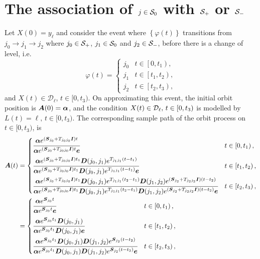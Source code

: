 \section{The association of \(j\in\mathcal{S}_0\) with \(\mathcal{S}_+\) or \(\mathcal{S}_-\)}\label{sec: zero states}
Let \(X(0)=y_\ell\) and consider the event where \(\left\{\varphi(t)\right\}\) transitions from \(j_0\to j_1\to j_2\) where \(j_0\in\mathcal{S}_+\), \(j_1\in\mathcal{S}_0\) and \(j_2\in\mathcal{S}_-\), before there is a change of level, i.e.~
\[\varphi(t) = \begin{cases}
	j_0 & t\in\left[0,t_1\right), \\
	j_1 & t\in\left[t_1,t_2\right), \\
	j_2 & t\in\left[t_2,t_3\right),
\end{cases}\]
and \(X(t)\in\mathcal D_\ell\), \(t\in[0,t_3)\). 
On approximating this event, the initial orbit position is \(\boldsymbol A(0)=\boldsymbol \alpha\), and the condition \(X(t)\in\mathcal{D}_\ell,\, t\in [0,t_3)\) is modelled by \(L(t)=\ell,\, t\in[0,t_3)\). The corresponding sample path of the orbit process on \(t\in[0,t_3)\), is 
\begin{align*}
\bs A(t) &= \begin{cases} 
	\cfrac{\bs \alpha e^{(\bs{S}_{j_0}+T_{{j_0}{j_0}}\bs{I})t}}{\bs \alpha e^{(\bs{S}_{j_0}+T_{{j_0}{j_0}}\bs{I})t}\bs e} & t\in\left[0,t_1\right), \\[10pt]
	\cfrac{\bs \alpha e^{(\bs{S}_{j_0}+T_{{j_0}{j_0}}\bs{I})t_1}\bs{D}({j_0},{j_1})e^{T_{{j_1}{j_1}}(t-t_1)}}{\bs \alpha e^{(\bs{S}_{j_0}+T_{{j_0}{j_0}}\bs{I})t_1}\bs{D}({j_0},{j_1})e^{T_{{j_1}{j_1}}(t-t_1)}\bs e} & t\in\left[t_1,t_2\right), \\[10pt]
	\cfrac{\bs \alpha e^{(\bs{S}_{j_0}+T_{{j_0}{j_0}}\bs{I})t_1}\bs{D}({j_0},{j_1})e^{T_{{j_1}{j_1}}(t_2-t_1)}\bs{D}({j_1},{j_2})e^{(\bs{S}_{j_2}+T_{{j_2}{j_2}}\bs{I})(t-t_2)}}{\bs \alpha e^{(\bs{S}_{j_0}+T_{{j_0}{j_0}}\bs{I})t_1}\bs{D}({j_0},{j_1})e^{T_{{j_1}{j_1}}(t_2-t_1)}\bs{D}({j_1},{j_2})e^{(\bs{S}_{j_2}+T_{{j_2}{j_2}}\bs{I})(t-t_2)}\bs e} & t\in\left[t_2,t_3\right),
\end{cases}
%
\\&= \begin{cases} 
	\cfrac{\bs \alpha e^{\bs{S}_{j_0}t}}{\bs \alpha e^{\bs{S}_{{j_0}}t}\bs e} & t\in\left[0,t_1\right), \\[10pt]
	\cfrac{\bs \alpha e^{\bs{S}_{j_0}t_1}\bs{D}({j_0},{j_1})}{\bs \alpha e^{\bs{S}_{j_0}t_1}\bs{D}({j_0},{j_1})\bs e} & t\in\left[t_1,t_2\right), \\[10pt] 
	\cfrac{\bs \alpha e^{\bs{S}_{j_0}t_1}\bs{D}({j_0},{j_1})\bs{D}({j_1},{j_2})e^{\bs{S}_{j_2}(t-t_2)}}{\bs \alpha e^{\bs{S}_{j_0}t_1}\bs{D}({j_0},{j_1})\bs{D}({j_1},{j_2})e^{\bs{S}_{j_2}(t-t_2)}\bs e} & t\in\left[t_2,t_3\right),
\end{cases}
\end{align*}
